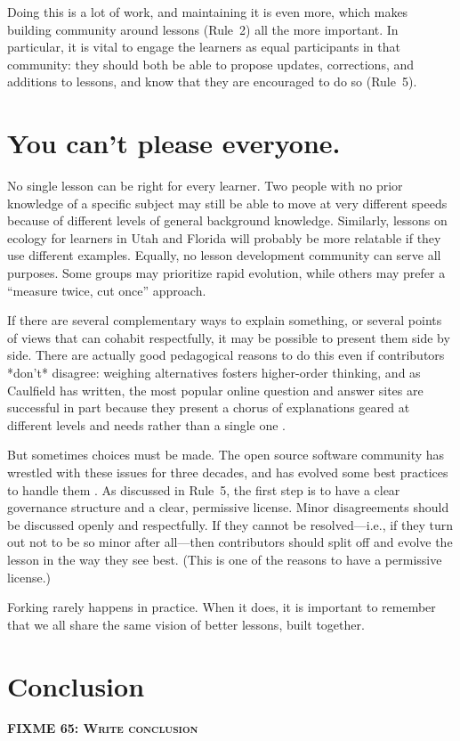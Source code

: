\documentclass[10pt,letterpaper]{article}
\newcommand{\fixme}[2]{\textsc{\textbf{FIXME {#1}: {#2}}}}
\newcommand{\rulemajor}[1]{\section{#1}}
\begin{document}
Doing this is a lot of work,
and maintaining it is even more,
which makes building community around lessons (Rule~2) all the more important.
In particular,
it is vital to engage the learners as equal participants in that community:
they should both be able to propose updates, corrections, and additions to lessons,
and know that they are encouraged to do so (Rule~5).

\rulemajor{You can't please everyone.}

No single lesson can be right for every learner.
Two people with no prior knowledge of a specific subject
may still be able to move at very different speeds
because of different levels of general background knowledge.
Similarly,
lessons on ecology for learners in Utah and Florida
will probably be more relatable if they use different examples.
Equally,
no lesson development community can serve all purposes.
Some groups may prioritize rapid evolution,
while others may prefer a ``measure twice, cut once'' approach.

If there are several complementary ways to explain something,
or several points of views that can cohabit respectfully,
it may be possible to present them side by side.
There are actually good pedagogical reasons to do this even if contributors *don't* disagree:
weighing alternatives fosters higher-order thinking,
and as Caulfield has written,
the most popular online question and answer sites
are successful in part because they present a chorus of explanations
geared at different levels and needs
rather than a single one \cite{choral-explanations}.

But sometimes choices must be made.
The open source software community has wrestled with these issues for three decades,
and has evolved some best practices to handle them
\cite{producing-oss}.
As discussed in Rule~5,
the first step is to have a clear governance structure and a clear, permissive license.
Minor disagreements should be discussed openly and respectfully.
If they cannot be resolved---i.e., if they turn out not to be so minor after all---then
contributors should split off and evolve the lesson in the way they see best.
(This is one of the reasons to have a permissive license.)

Forking rarely happens in practice.
When it does,
it is important to remember that we all share the same vision of better lessons, built together.

\section*{Conclusion}

\fixme{65}{Write conclusion}


\end{document}
